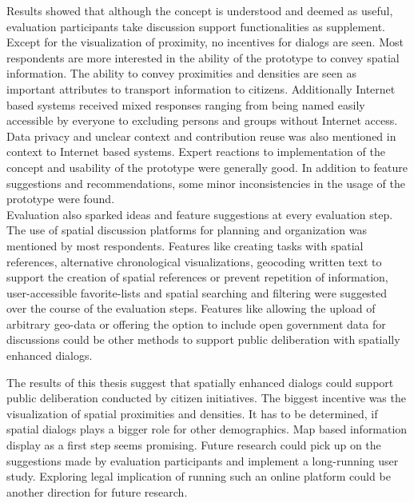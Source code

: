 Results showed that although the concept is understood and deemed as useful, evaluation participants take discussion support functionalities as supplement. Except for the visualization of proximity, no incentives for dialogs are seen. Most respondents are more interested in the ability of the prototype to convey spatial information. The ability to convey proximities and densities are seen as important attributes to transport information to citizens. Additionally Internet based systems received mixed responses ranging from being named easily accessible by everyone to excluding persons and groups without Internet access. Data privacy and unclear context and contribution reuse was also mentioned in context to Internet based systems. Expert reactions to implementation of the concept and usability of the prototype were generally good. In addition to feature suggestions and recommendations, some minor inconsistencies in the usage of the prototype were found.\\
Evaluation also sparked ideas and feature suggestions at every evaluation step. The use of spatial discussion platforms for planning and organization was mentioned by most respondents. Features like creating tasks with spatial references, alternative chronological visualizations, geocoding written text to support the creation of spatial references or prevent repetition of information, user-accessible favorite-lists and spatial searching and filtering were suggested over the course of the evaluation steps. Features like allowing the upload of arbitrary geo-data or offering the option to include open government data for discussions could be other methods to support public deliberation with spatially enhanced dialogs.


The results of this thesis suggest that spatially enhanced dialogs could support public deliberation conducted by citizen initiatives. The biggest incentive was the visualization of spatial proximities and densities. It has to be determined, if spatial dialogs plays a bigger role for other demographics. Map based information display as a first step seems promising. Future research could pick up on the suggestions made by evaluation participants and implement a long-running user study. Exploring legal implication of running such an online platform could be another direction for future research.
